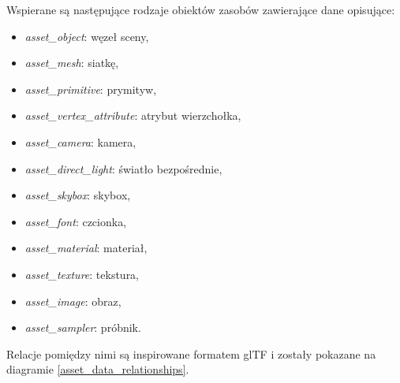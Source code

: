 Wspierane są następujące rodzaje obiektów zasobów zawierające dane opisujące:
\begin{itemize}
	\item \textit{asset\_object}: węzeł sceny,
	\item \textit{asset\_mesh}: siatkę,
	\item \textit{asset\_primitive}: prymityw,
	\item \textit{asset\_vertex\_attribute}: atrybut wierzchołka,
	\item \textit{asset\_camera}: kamera,
	\item \textit{asset\_direct\_light}: światło bezpośrednie,
	\item \textit{asset\_skybox}: skybox,
	\item \textit{asset\_font}: czcionka,
	\item \textit{asset\_material}: materiał,
	\item \textit{asset\_texture}: tekstura,
	\item \textit{asset\_image}: obraz,
	\item \textit{asset\_sampler}: próbnik.
\end{itemize}
Relacje pomiędzy nimi są inspirowane formatem glTF i zostały pokazane na diagramie \ref{asset_data_relationships}.
